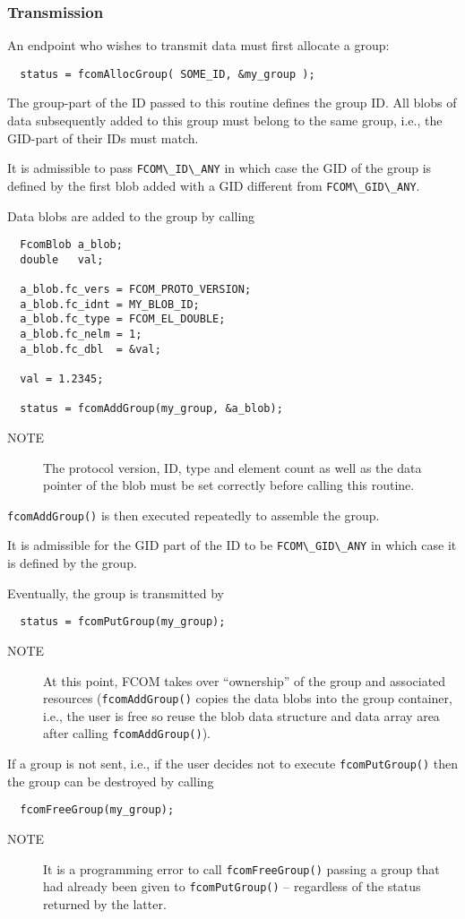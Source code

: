 \documentclass[11pt]{article}
\newcommand{\fcom}{FCOM}
\newcommand{\blob}{blob}
\newcommand{\group}{group}
\newcommand{\cstl}[1]{{\lstinline+#1+}}
\newcommand{\note}[1]{
	\begin{description}
		\item[NOTE] #1
	\end{description}
}
\begin{document}
    \subsubsection{Transmission}
      An endpoint who wishes to transmit data must first
      allocate a group:
      \begin{verbatim}
  status = fcomAllocGroup( SOME_ID, &my_group );
      \end{verbatim}
      The group-part of the ID passed to this routine
      defines the group ID. All \blob{}s of data subsequently
      added to this \group{} must belong to the same \group{},
      i.e., the GID-part of their IDs must match.

      It is admissible to pass \cstl{FCOM\_ID\_ANY} in which
      case the GID of the group is defined by the first
	  blob added with a GID different from \cstl{FCOM\_GID\_ANY}.

      Data \blob{}s are added to the group by calling
      \begin{verbatim}
  FcomBlob a_blob;
  double   val;

  a_blob.fc_vers = FCOM_PROTO_VERSION;
  a_blob.fc_idnt = MY_BLOB_ID; 
  a_blob.fc_type = FCOM_EL_DOUBLE;
  a_blob.fc_nelm = 1;
  a_blob.fc_dbl  = &val;
  
  val = 1.2345;

  status = fcomAddGroup(my_group, &a_blob);
      \end{verbatim}
      \note{The protocol version, ID, type and element
      count as well as the data pointer of the \blob{}
      must be set correctly before calling this routine.}
      {\tt fcomAddGroup()} is then executed repeatedly
      to assemble the \group{}.

      It is admissible for the GID part of the ID to
      be \cstl{FCOM\_GID\_ANY} in which case it is defined
      by the group.

      Eventually, the \group{} is transmitted by
      \begin{verbatim}
  status = fcomPutGroup(my_group);
      \end{verbatim}
      \note{At this point, \fcom{} takes over 
      ``ownership'' of the group and associated resources
      ({\tt fcomAddGroup()} copies the data \blob{}s
      into the \group{} container, i.e., the user is
      free so reuse the \blob{} data structure and data 
      array area after calling {\tt fcomAddGroup()}).}

      If a \group{} is not sent, i.e., if the
      user decides not to execute {\tt fcomPutGroup()}
      then the \group{} can be destroyed by
      calling
      \begin{verbatim}
  fcomFreeGroup(my_group);
      \end{verbatim}
      \note{It is a programming error to call {\tt fcomFreeGroup()}
            passing a \group{} that had already been given to
            {\tt fcomPutGroup()} -- regardless of the status
            returned by the latter.}
\end{document}
